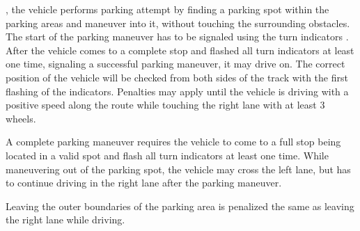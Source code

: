 , the vehicle performs  parking
attempt by finding a parking spot within the parking areas and maneuver into
it, without touching the surrounding obstacles.   The start of the parking
maneuver has to be signaled using the turn indicators .
After the vehicle comes
to a complete stop and flashed all turn indicators at least one time, signaling
a successful parking maneuver, it may drive on. The correct position of the
vehicle will be checked from both sides of the track with the first flashing of
the indicators. Penalties may apply until the vehicle is driving with a
positive speed along the route while touching the right lane with at least 3
wheels.

A complete parking maneuver requires the vehicle to come to a full stop being
located in a valid spot  and flash all turn
indicators at least one time. While maneuvering out of the parking spot, the
vehicle may cross the left lane, but has to continue driving in the right lane
after the parking maneuver.

Leaving the outer boundaries of the parking area is penalized the same as
leaving the right lane while driving. 

